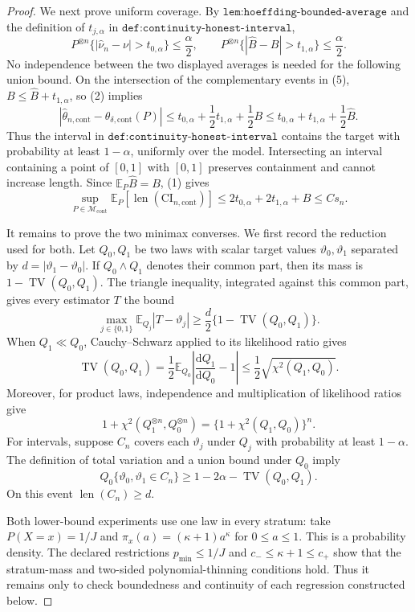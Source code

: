 \documentclass{article}
\begin{document}
\begin{proof}
We next prove uniform coverage.  By \(\texttt{lem:hoeffding-bounded-average}\) and the definition of \(t_{j,\alpha}\) in \(\texttt{def:continuity-honest-interval}\),
\[
 P^{\otimes n}\{|\widehat\nu_n-\nu|>t_{0,\alpha}\}\leq\frac\alpha2,
 \qquad
 P^{\otimes n}\{|\widehat B-B|>t_{1,\alpha}\}\leq\frac\alpha2. \tag{5}
\]
No independence between the two displayed averages is needed for the following union bound.  On the intersection of the complementary events in (5), \(B\leq\widehat B+t_{1,\alpha}\), so (2) implies
\[
 |\widehat\theta_{n,\mathrm{cont}}-\theta_{\delta,\mathrm{cont}}(P)|
 \leq t_{0,\alpha}+\frac12t_{1,\alpha}+\frac12B
 \leq t_{0,\alpha}+t_{1,\alpha}+\frac12\widehat B. \tag{6}
\]
Thus the interval in \(\texttt{def:continuity-honest-interval}\) contains the target with probability at least \(1-\alpha\), uniformly over the model.  Intersecting an interval containing a point of \([0,1]\) with \([0,1]\) preserves containment and cannot increase length.  Since \(\mathbb E_P\widehat B=B\), (1) gives
\[
 \sup_{P\in\mathcal M_{\mathrm{cont}}}
 \mathbb E_P[\operatorname{len}(\mathrm{CI}_{n,\mathrm{cont}})]
 \leq2t_{0,\alpha}+2t_{1,\alpha}+B
 \leq Cs_n. \tag{7}
\]

It remains to prove the two minimax converses.  We first record the reduction used for both.  Let \(Q_0,Q_1\) be two laws with scalar target values \(\vartheta_0,\vartheta_1\) separated by \(d=|\vartheta_1-\vartheta_0|\).  If \(Q_0\wedge Q_1\) denotes their common part, then its mass is \(1-\operatorname{TV}(Q_0,Q_1)\).  The triangle inequality, integrated against this common part, gives every estimator \(T\) the bound
\[
 \max_{j\in\{0,1\}}\mathbb E_{Q_j}|T-\vartheta_j|
 \geq\frac d2\{1-\operatorname{TV}(Q_0,Q_1)\}. \tag{8}
\]
When \(Q_1\ll Q_0\), Cauchy--Schwarz applied to its likelihood ratio gives
\[
 \operatorname{TV}(Q_0,Q_1)
 =\frac12\mathbb E_{Q_0}\left|\frac{\mathrm dQ_1}{\mathrm dQ_0}-1\right|
 \leq\frac12\sqrt{\chi^2(Q_1,Q_0)}. \tag{9}
\]
Moreover, for product laws, independence and multiplication of likelihood ratios give
\[
 1+\chi^2(Q_1^{\otimes n},Q_0^{\otimes n})
 =\{1+\chi^2(Q_1,Q_0)\}^n. \tag{10}
\]
For intervals, suppose \(C_n\) covers each \(\vartheta_j\) under \(Q_j\) with probability at least \(1-\alpha\).  The definition of total variation and a union bound under \(Q_0\) imply
\[
 Q_0\{\vartheta_0,\vartheta_1\in C_n\}
 \geq1-2\alpha-\operatorname{TV}(Q_0,Q_1). \tag{11}
\]
On this event \(\operatorname{len}(C_n)\geq d\).

Both lower-bound experiments use one law in every stratum: take \(P(X=x)=1/J\) and
\(\pi_x(a)=(\kappa+1)a^\kappa\) for \(0\leq a\leq1\).  This is a probability density.  The declared restrictions \(p_{\min}\leq1/J\) and \(c_-\leq\kappa+1\leq c_+\) show that the stratum-mass and two-sided polynomial-thinning conditions hold.  Thus it remains only to check boundedness and continuity of each regression constructed below.


\end{proof}
\end{document}
